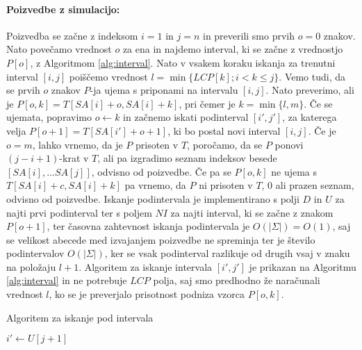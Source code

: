 \paragraph{Poizvedbe z simulacijo:}
Poizvedba se začne z indeksom $i=1$ in $j=n$ in preverili smo prvih $o=0$ znakov. Nato povečamo vrednost $o$ za ena in najdemo interval, ki se začne z vrednostjo $P[o]$, z Algoritmom \ref{alg:interval}. Nato v vsakem koraku iskanja za trenutni interval $[i,j]$ poiščemo vrednost $l=\min\{LCP[k];i<k\le j\}$. Vemo tudi, da se prvih $o$ znakov $P$-ja ujema s priponami na intervalu $[i,j]$. Nato preverimo, ali je $P[o,k]=T[SA[i]+o,SA[i]+k]$, pri čemer je $k=\min\{l,m\}$. Če se ujemata, popravimo $o\leftarrow k$ in začnemo iskati podinterval $[i',j']$, za katerega velja $P[o+1]=T[SA[i']+o+1]$, ki bo postal novi interval $[i,j]$. Če je $o=m$, lahko vrnemo, da je $P$ prisoten v $T$, poročamo, da se $P$ ponovi $(j-i+1)$-krat v $T$, ali pa izgradimo seznam indeksov besede $[SA[i],\dots SA[j]]$, odvisno od poizvedbe. Če pa se $P[o,k]$ ne ujema s $T[SA[i]+c,SA[i]+k]$ pa vrnemo, da $P$ ni prisoten v $T$, 0 ali prazen seznam, odvisno od poizvedbe. Iskanje podintervala je implementirano s polji $D$ in $U$ za najti prvi podinterval ter s poljem $NI$ za najti interval, ki se začne z znakom $P[o+1]$, ter časovna zahtevnost iskanja podintervala je $O(|\Sigma|)=O(1)$, saj se velikost abecede med izvajanjem poizvedbe ne spreminja ter je število podintervalov $O(|\Sigma|)$, ker se vsak podinterval razlikuje od drugih vsaj v znaku na položaju $l+1$. Algoritem za iskanje intervala $[i',j']$ je prikazan na Algoritmu \ref{alg:interval} in ne potrebuje $LCP$ polja, saj smo predhodno že naračunali vrednost $l$, ko se je preverjalo prisotnost podniza vzorca $P[o,k]$. 

\begin{algorithm}[htb]

    \caption{Algoritem za iskanje pod intervala }\label{alg:interval}
    {
                    {$i'\leftarrow U[j+1]$}

            {\Vrni{$[i,i'-1]$}}


                {\Vrni{$[i',j]$}}
        
        {\Vrni{$[-1,-1]$}}    
    }
\end{algorithm}


